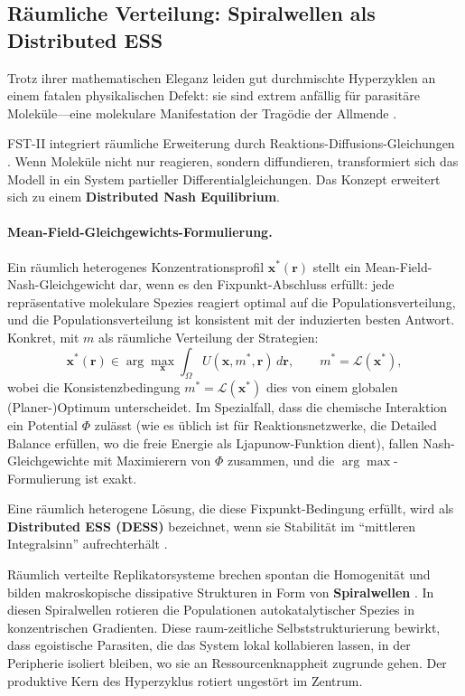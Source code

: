 \documentclass[12pt,a4paper]{article}
\theoremstyle{remark}
\begin{document}
\subsection{R\"aumliche Verteilung: Spiralwellen als Distributed ESS}

Trotz ihrer mathematischen Eleganz leiden gut durchmischte Hyperzyklen an einem fatalen physikalischen Defekt: sie sind extrem anf\"allig f\"ur parasit\"are Molek\"ule---eine molekulare Manifestation der Trag\"odie der Allmende \citep{HypercycleInfinite}.

FST-II integriert r\"aumliche Erweiterung durch Reaktions-Diffusions-Gleichungen \citep{ReplicatorDiffusion}. Wenn Molek\"ule nicht nur reagieren, sondern diffundieren, transformiert sich das Modell in ein System partieller Differentialgleichungen. Das Konzept erweitert sich zu einem \textbf{Distributed Nash Equilibrium}.

\paragraph{Mean-Field-Gleichgewichts-Formulierung.}
Ein r\"aumlich heterogenes Konzentrationsprofil $\mathbf{x}^*(\mathbf{r})$ stellt ein Mean-Field-Nash-Gleichgewicht dar, wenn es den Fixpunkt-Abschluss erf\"ullt: jede repr\"asentative molekulare Spezies reagiert optimal auf die Populationsverteilung, und die Populationsverteilung ist konsistent mit der induzierten besten Antwort. Konkret, mit $m$ als r\"aumliche Verteilung der Strategien:
\begin{equation}
\mathbf{x}^*(\mathbf{r}) \in \arg\max_{\mathbf{x}} \int_\Omega U(\mathbf{x}, m^*, \mathbf{r}) \, d\mathbf{r}, \qquad m^* = \mathcal{L}(\mathbf{x}^*),
\end{equation}
wobei die Konsistenzbedingung $m^* = \mathcal{L}(\mathbf{x}^*)$ dies von einem globalen (Planer-)Optimum unterscheidet. Im Spezialfall, dass die chemische Interaktion ein Potential $\Phi$ zul\"asst (wie es \"ublich ist f\"ur Reaktionsnetzwerke, die Detailed Balance erf\"ullen, wo die freie Energie als Ljapunow-Funktion dient), fallen Nash-Gleichgewichte mit Maximierern von $\Phi$ zusammen, und die $\arg\max$-Formulierung ist exakt.

Eine r\"aumlich heterogene L\"osung, die diese Fixpunkt-Bedingung erf\"ullt, wird als \textbf{Distributed ESS (DESS)} bezeichnet, wenn sie Stabilit\"at im ``mittleren Integralsinn'' aufrechterh\"alt \citep{ReplicatorDiffusion}.

R\"aumlich verteilte Replikatorsysteme brechen spontan die Homogenit\"at und bilden makroskopische dissipative Strukturen in Form von \textbf{Spiralwellen} \citep{SpiralWaves}. In diesen Spiralwellen rotieren die Populationen autokatalytischer Spezies in konzentrischen Gradienten. Diese raum-zeitliche Selbststrukturierung bewirkt, dass egoistische Parasiten, die das System lokal kollabieren lassen, in der Peripherie isoliert bleiben, wo sie an Ressourcenknappheit zugrunde gehen. Der produktive Kern des Hyperzyklus rotiert ungest\"ort im Zentrum.
\end{document}
